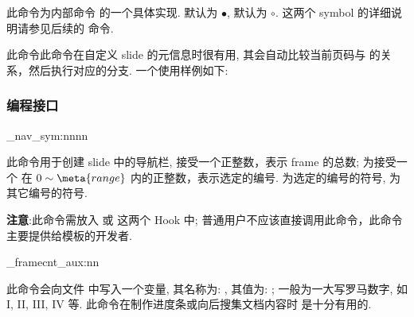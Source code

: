 \begin{function}[updated=2025-04-25]{\zslidenavsym}
  \begin{syntax}
  \end{syntax}
  此命令为内部命令  的一个具体实现.  默认为 $\bullet$, 
   默认为 $\circ$. 这两个 symbol 的详细说明请参见后续的  命令.
\end{function}


\begin{function}[updated=2025-04-25]{\zslidepageTF}
  \begin{syntax}
  \end{syntax}
  此命令此命令在自定义 slide 的元信息时很有用, 其会自动比较当前页码与  的关系，然后执行对应的分支. 
  一个使用样例如下:
\end{function}
\begin{DocExample}
\end{DocExample}


\clearpage
\subsubsection{编程接口}

\begin{function}[updated=2025-04-25]{\zslide_nav_sym:nnnn}
  \begin{syntax}
     
  \end{syntax}
  此命令用于创建 slide 中的导航栏,  接受一个正整数，表示 frame 的总数;  为接受一个
  在 $0\sim \meta{range}$ 内的正整数，表示选定的编号.  为选定的编号的符号,  为
  其它编号的符号.\par
  \textbf{注意}:此命令需放入  或  这两个 Hook 中; 普通用户不应该直接调用此命令，此命令主要提供给模板的开发者.
\end{function}



\begin{function}[updated=2025-04-25]{\zslide_framecnt_aux:nn}
  \begin{syntax}
     
  \end{syntax}
  此命令会向文件  中写入一个变量, 其名称为: , 其值为:
  ;  一般为一大写罗马数字, 如 I, II, III, IV 等. 此命令在制作进度条或向后搜集文档内容时
  是十分有用的.
\end{function}


